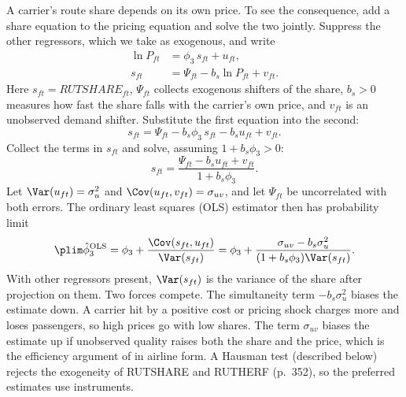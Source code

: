  A carrier's route share depends on its own price. To see the consequence,
add a share equation to the pricing equation and solve the two jointly. Suppress the other regressors, which
we take as exogenous, and write
\begin{align*}
\ln P_{ft} &= \phi_3\, s_{ft} + u_{ft}, \\
s_{ft} &= \Psi_{ft} - b_s \ln P_{ft} + v_{ft} .
\end{align*}
Here $s_{ft} = \mathit{RUTSHARE}_{ft}$, $\Psi_{ft}$ collects exogenous shifters of the share, $b_s > 0$
measures how fast the share falls with the carrier's own price, and $v_{ft}$ is an unobserved demand shifter.
Substitute the first equation into the second:
\begin{equation*}
s_{ft} = \Psi_{ft} - b_s \phi_3\, s_{ft} - b_s u_{ft} + v_{ft} .
\end{equation*}
Collect the terms in $s_{ft}$ and solve, assuming $1 + b_s \phi_3 > 0$:
\begin{equation*}
s_{ft} = \frac{\Psi_{ft} - b_s u_{ft} + v_{ft}}{1 + b_s \phi_3} .
\end{equation*}
Let $\Var(u_{ft}) = \sigma_u^2$ and $\Cov(u_{ft}, v_{ft}) = \sigma_{uv}$, and let $\Psi_{ft}$ be uncorrelated
with both errors. The ordinary least squares (OLS) estimator then has probability limit
\begin{equation}\label{eq:09-bor-olsbias}
\plim \hat\phi_3^{\mathrm{OLS}} = \phi_3 + \frac{\Cov(s_{ft}, u_{ft})}{\Var(s_{ft})}
= \phi_3 + \frac{\sigma_{uv} - b_s \sigma_u^2}{(1 + b_s\phi_3) \Var(s_{ft})} .
\end{equation}
With other regressors present, $\Var(s_{ft})$ is the variance of the share after projection on them. Two forces
compete. The simultaneity term $-b_s\sigma_u^2$ biases the estimate down. A carrier hit by a positive cost
or pricing shock charges more and loses passengers, so high prices go with low shares. The term $\sigma_{uv}$
biases the estimate up if unobserved quality raises both the share and the price, which is the efficiency
argument of \citet{Demsetz1973} in airline form. A Hausman test (described below) rejects the exogeneity of
RUTSHARE and RUTHERF (p.~352), so the preferred estimates use instruments.

